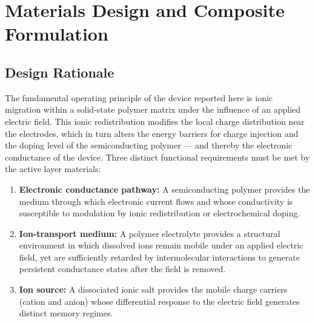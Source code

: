\documentclass[12pt, a4paper, twoside]{report}
\begin{document}
\section{Materials Design and Composite Formulation}\label{sec:materials_design}

\subsection{Design Rationale}\label{subsec:design_rationale}

The fundamental operating principle of the device reported here is ionic migration within a solid-state polymer matrix under the influence of an applied electric field. This ionic redistribution modifies the local charge distribution near the electrodes, which in turn alters the energy barriers for charge injection and the doping level of the semiconducting polymer — and thereby the electronic conductance of the device. Three distinct functional requirements must be met by the active layer materials:

\begin{enumerate}
  \item \textbf{Electronic conductance pathway:} A semiconducting polymer provides the medium through which electronic current flows and whose conductivity is susceptible to modulation by ionic redistribution or electrochemical doping.
  \item \textbf{Ion-transport medium:} A polymer electrolyte provides a structural environment in which dissolved ions remain mobile under an applied electric field, yet are sufficiently retarded by intermolecular interactions to generate persistent conductance states after the field is removed.
  \item \textbf{Ion source:} A dissociated ionic salt provides the mobile charge carriers (cation and anion) whose differential response to the electric field generates distinct memory regimes.
\end{enumerate}
\end{document}

